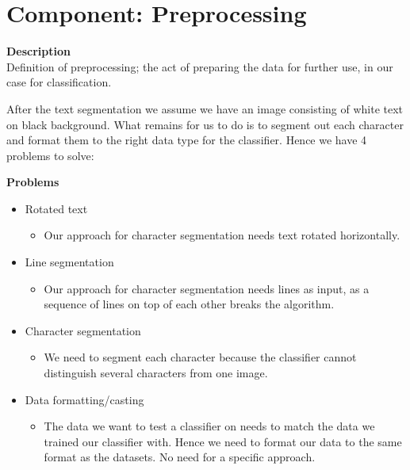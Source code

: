 \documentclass[Report.tex]{subfiles}
\begin{document}
\section{Component: Preprocessing}
\label{Method:Preprocessing}
\begin{flushleft}
  \textbf{Description} \\
  Definition of preprocessing; the act of preparing the data for further use,
  in our case for classification. \par
  After the text segmentation we assume we have an image consisting of white text on black background. What remains for us to do is to segment out each character and format them to the right data type for the classifier. Hence we have 4 problems to solve:
\end{flushleft}

\begin{flushleft}
  \textbf{Problems}
  \begin{itemize}
    \item{Rotated text}
    \begin{itemize}
      \item{Our approach for character segmentation needs text rotated horizontally.}
    \end{itemize}
    \item{Line segmentation}
    \begin{itemize}
      \item{Our approach for character segmentation needs lines as input, as a sequence of lines on top of each other breaks the algorithm.}
    \end{itemize}
    \item{Character segmentation}
    \begin{itemize}
      \item{We need to segment each character because the classifier cannot distinguish several characters from one image.}
    \end{itemize}
    \item{Data formatting/casting}
    \begin{itemize}
      \item{The data we want to test a classifier on needs to match the data we trained our classifier with. Hence we need to format our data to the same format as the datasets.  No need for a specific approach.}
    \end{itemize}
  \end{itemize}
\end{flushleft}
\end{document}
